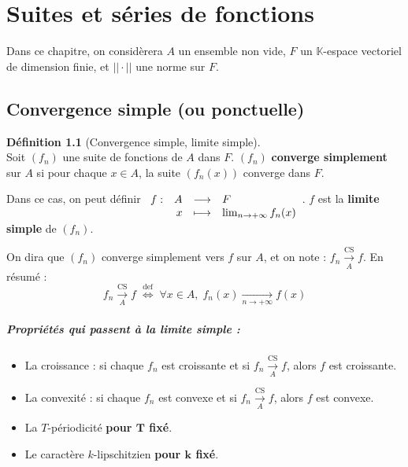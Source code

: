 \documentclass[12pt]{book}
\let\ensembleNombre\mathbb
\newcommand*\K{\ensuremath{\ensembleNombre{K}}}
\newcommand{\app}[5]{\ensuremath{
\begin{array}[t]{lrcl}
#1 : & #2 & \longrightarrow & #3 \\
    & #4 & \longmapsto & #5 \end{array}
}}
\newcommand{\limite}[2]{\ensuremath{\underset{#1 \to #2}{\longrightarrow}}}
\newcommand{\ls}[1]{\ensuremath{\overset{\mathrm{CS}}{\underset{#1}{\longrightarrow}}}}
\theoremstyle{definition}
\newtheorem*{defi}{Définition}
\theoremstyle{remark}
\newenvironment{fdef}
  {\begin{mdframed}[roundcorner=10pt, linewidth=1pt]\begin{defi}}
  {\end{defi}\end{mdframed}}
\begin{document}
\chapter{Suites et séries de fonctions}
	Dans ce chapitre, on considèrera $A$ un ensemble non vide, $F$ un $\K$-espace vectoriel de dimension finie, et $||\cdot||$ une norme sur $F$.
	
	\section{Convergence simple (ou ponctuelle)}
	\begin{fdef}[Convergence simple, limite simple]\mbox{~}\\
	Soit $(f_n)$ une suite de fonctions de $A$ dans $F$. $(f_n)$ \textbf{converge simplement} sur $A$ si pour chaque $x \in A$, la suite $(f_n(x))$ converge dans $F$.
	
	\noindent Dans ce cas, on peut définir $\app{f}{A}{F}{x}{\lim_{n \to +\infty} f_n(x)}$. $f$ est la \textbf{limite simple} de $(f_n)$.
	\end{fdef}
	
	On dira que $(f_n)$ converge simplement vers $f$ sur $A$, et on note : $f_n \ls{A} f$. En résumé :
	\[ \boxed{ f_n \ls{A} f \; \overset{\mathrm{def}} \Longleftrightarrow \; \forall x \in A, \; f_n(x) \limite{n}{+\infty} f(x) } \]
	
	\paragraph{Propriétés qui passent à la limite simple :} 
	\begin{itemize}
	\item La croissance : si chaque $f_n$ est croissante et si $f_n \ls A f$, alors $f$ est croissante.
	\item La convexité : si chaque $f_n$ est convexe et si $f_n \ls A f$, alors $f$ est convexe.
	\item La $T$-périodicité \textbf{pour $\bm{T}$ fixé}.
	\item Le caractère $k$-lipschitzien \textbf{pour $\bm{k}$ fixé}.
	\end{itemize}
	
\end{document}
